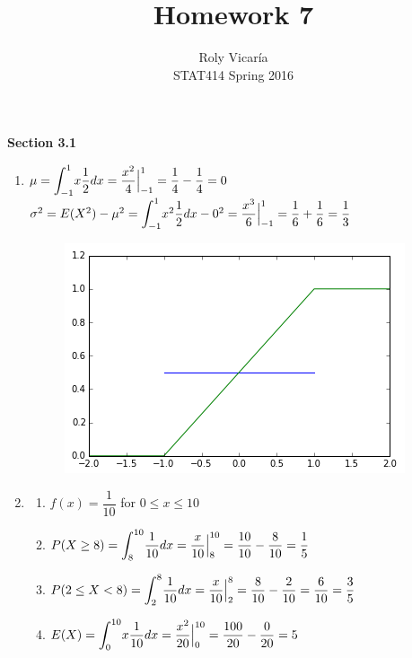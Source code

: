 \documentclass{article}
\title{Homework 7}
\author{Roly Vicar\'ia \\ STAT414 Spring 2016}
\begin{document}
    
    \maketitle
    
    \textbf{Section 3.1}
    \begin{enumerate}
      \addtocounter{enumi}{1}
      \item 
	$\mu = \mathlarger{\int}_{-1}^1 x\dfrac{1}{2} dx = \dfrac{x^2}{4} \Big|_{-1}^1 
	  = \dfrac{1}{4} - \dfrac{1}{4} = 0$ \\
	$\sigma^2 = E(X^2) - \mu^2 = \mathlarger{\int}_{-1}^1 x^2 \dfrac{1}{2} dx - 0^2
	  = \dfrac{x^3}{6} \Big|_{-1}^1 = \dfrac{1}{6} + \dfrac{1}{6} = \dfrac{1}{3}$
	
	\begin{figure}[h!]
	  \centering
	  \includegraphics[scale=.5,keepaspectratio=true]{./images/pdf_cdf_U-1-1.png}
	\end{figure}
      
      \item
	\begin{enumerate}
	 \item 
	  $f(x) = \dfrac{1}{10}$ for $0 \le x \le 10$
	 
	 \item
	  $P(X \ge 8) = \mathlarger{\int}_8^{10} {\dfrac{1}{10} dx} = \dfrac{x}{10} \Big|_8^{10}
	    = \dfrac{10}{10} - \dfrac{8}{10} = \dfrac{1}{5}$
	 
	 \item
	  $P(2 \le X < 8) = \mathlarger{\int}_2^8 {\dfrac{1}{10} dx} = \dfrac{x}{10} \Big|_2^8
	    = \dfrac{8}{10} - \dfrac{2}{10} = \dfrac{6}{10} = \dfrac{3}{5}$
	 
	 \item
	  $E(X) = \mathlarger{\int}_0^{10} {x \dfrac{1}{10} dx} = \dfrac{x^2}{20} \Big|_0^{10}
	    = \dfrac{100}{20} - \dfrac{0}{20} = 5$
	 

\end{enumerate}
\end{enumerate}
\end{document}
